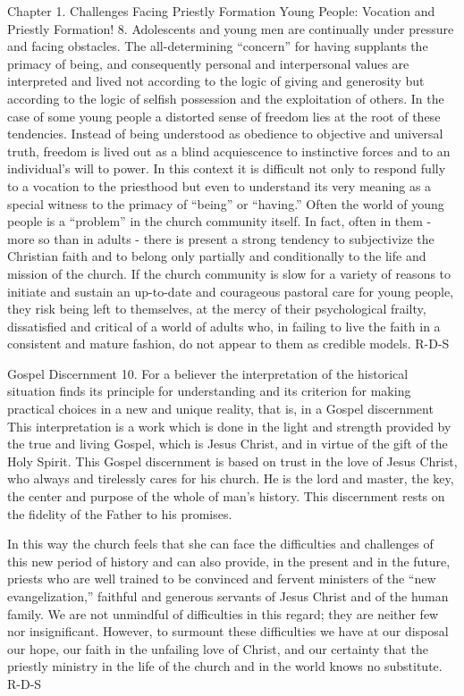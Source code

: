 \documentclass[oneside]{book}
\begin{document}
Chapter 1. Challenges Facing Priestly Formation
Young People: Vocation and Priestly Formation!
8. Adolescents and young men are continually under pressure and facing
obstacles. The all-determining ``concern'' for having supplants the primacy of
being, and consequently personal and interpersonal values are interpreted and
lived not according to the logic of giving and generosity but according to the
logic of selfish possession and the exploitation of others.
In the case of some young people a distorted sense of freedom lies at the root
of these tendencies. Instead of being understood as obedience to objective and
universal truth, freedom is lived out as a blind acquiescence to instinctive
forces and to an individual's will to power. In this context it is difficult not
only to respond fully to a vocation to the priesthood but even to understand its
very meaning as a special witness to the primacy of ``being'' or ``having.''
Often the world of young people is a ``problem'' in the church community
itself. In fact, often in them - more so than in adults - there is present a
strong tendency to subjectivize the Christian faith and to belong only partially
and conditionally to the life and mission of the church. If the church community
is slow for a variety of reasons to initiate and sustain an up-to-date and
courageous pastoral care for young people, they risk being left to themselves,
at the mercy of their psychological frailty, dissatisfied and critical of a
world of adults who, in failing to live the faith in a consistent and mature
fashion, do not appear to them as credible models.
R-D-S

Gospel Discernment
10. For a believer the interpretation of the historical situation finds its
principle for understanding and its criterion for making practical choices in a
new and unique reality, that is, in a Gospel discernment This interpretation is
a work which is done in the light and strength provided by the true and living
Gospel, which is Jesus Christ, and in virtue of the gift of the Holy Spirit.
This Gospel discernment is based on trust in the love of Jesus Christ, who
always and tirelessly cares for his church. He is the lord and master, the key,
the center and purpose of the whole of man's history. This discernment rests on
the fidelity of the Father to his promises.

In this way the church feels that she can face the difficulties and challenges
of this new period of history and can also provide, in the present and in the
future, priests who are well trained to be convinced and fervent ministers of
the ``new evangelization,'' faithful and generous servants of Jesus Christ and
of the human family. We are not unmindful of difficulties in this regard; they
are neither few nor insignificant. However, to surmount these difficulties we
have at our disposal our hope, our faith in the unfailing love of Christ, and
our certainty that the priestly ministry in the life of the church and in the
world knows no substitute.
R-D-S
\end{document}
